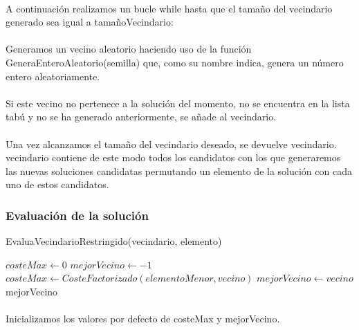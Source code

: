 \documentclass{article}
\begin{document}
		\paragraph{}A continuación realizamos un bucle while hasta que el tamaño del vecindario generado sea igual a tamañoVecindario:
		
		\paragraph{}Generamos un vecino aleatorio haciendo uso de la función GeneraEnteroAleatorio(semilla) que, como su nombre indica, genera un número entero aleatoriamente.
		
		\paragraph{}Si este vecino no pertenece a la solución del momento, no se encuentra en la lista tabú y no se ha generado anteriormente, se añade al vecindario.
		
		\paragraph{}Una vez alcanzamos el tamaño del vecindario deseado, se devuelve vecindario. vecindario contiene de este modo todos los candidatos con los que generaremos las nuevas soluciones candidatas permutando un elemento de la solución con cada uno de estos candidatos.
		
		\subsubsection{Evaluación de la solución}
		
		\begin{algorithm}[H]
			\caption{EvaluaVecindarioRestringido(vecindario, elemento)}
			\begin{algorithmic}
				\STATE $costeMax \leftarrow 0$
				\STATE $mejorVecino \leftarrow -1$	
				\STATE $costeMax \leftarrow CosteFactorizado(elementoMenor, vecino)$
				\STATE $mejorVecino \leftarrow vecino$
				\ENDIF
				\ENDFOR
				\RETURN mejorVecino
			\end{algorithmic}
		\end{algorithm}
	
		\paragraph{}Inicializamos los valores por defecto de costeMax y mejorVecino.
		
\end{document}
